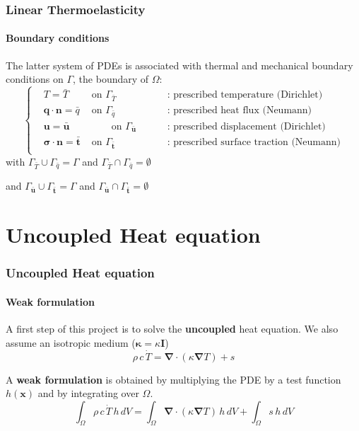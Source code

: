 \documentclass[10pt,xcolor=pdftex,dvipsnames,table]{beamer}
\begin{document}
\begin{frame}
	\frametitle{ Linear Thermoelasticity }
	\framesubtitle{ Boundary conditions }
	
	The latter system of PDEs is associated with thermal and mechanical boundary conditions on $\Gamma$, the boundary of $\Omega$:
	\begin{equation*}
	\left\{
	\begin{aligned}
		&  T = \bar{T}                                      & \text { on } \Gamma_{\bar{T}} & \qquad \text{ : prescribed temperature (Dirichlet)}\\
		&  \boldsymbol{q}\cdot\boldsymbol{n}  = \bar{q}     & \text { on } \Gamma_{\bar{q}} & \qquad \text{ : prescribed heat flux (Neumann)}\\
		&  \boldsymbol{u} = \bar{\boldsymbol{u}}     & \qquad \text { on } \Gamma_{\bar{\boldsymbol{u}}} & \qquad \text{ : prescribed displacement (Dirichlet)} \\
		&  \boldsymbol{\sigma}\cdot\boldsymbol{n}  = \bar{\boldsymbol{t}}     & \text { on } \Gamma_{\bar{\boldsymbol{t}}} & \qquad \text{ : prescribed surface traction (Neumann)} \\
	\end{aligned}
	\right.    
\end{equation*}		
	with $\Gamma_{\bar{T}} \cup \Gamma_{\bar{q}} = \Gamma$ and $\Gamma_{\bar{T}} \cap \Gamma_{\bar{q}} = \emptyset$
	
	and $\Gamma_{\bar{\boldsymbol{u}}} \cup \Gamma_{\bar{\boldsymbol{t}}} = \Gamma$ and $\Gamma_{\bar{\boldsymbol{u}}} \cap \Gamma_{\bar{\boldsymbol{t}}} = \emptyset$
\end{frame}

\section{ Uncoupled Heat equation  }

\begin{frame}
	\frametitle{ Uncoupled Heat equation }
	\framesubtitle{ Weak formulation }
	
	A first step of this project is to solve the \textbf{uncoupled} heat equation. We also assume an isotropic medium ($\boldsymbol{\kappa} = \kappa \boldsymbol{I}$)	
	\begin{equation*}
		  \rho\,c\,\dot{T} =  \boldsymbol{\nabla}\cdot \left(  \kappa \boldsymbol{\nabla} T \right) + s
	\end{equation*}	


	A \textbf{weak formulation} is obtained by multiplying the PDE by a test function $h(\boldsymbol{x})$ and by integrating over $\Omega$.
	\begin{equation*}
		\int_{\Omega}\rho\,c\,\dot{T}\,h\,dV 
		= \int_{\Omega} \boldsymbol{\nabla}\cdot \left(  \kappa \boldsymbol{\nabla} T \right) \, h \, dV
		+ \int_{\Omega} s\, h\, dV
	\end{equation*}		
	

\end{frame}
\end{document}
